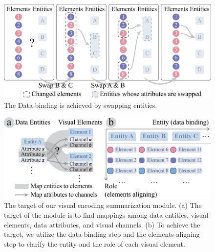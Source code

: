 \begin{figure}[tp]
    \centering
    \setlength{\belowcaptionskip}{-10pt}
    \includegraphics[width=1\columnwidth]{figures/DataBinding.eps}
    \caption{ The Data binding is achieved by swapping entities. 
    }
    \label{fig:DataBinding}
\end{figure}

\begin{figure}[tp]
    \centering
    \setlength{\belowcaptionskip}{-10pt}
    \includegraphics[width=1\columnwidth]{figures/ElementAligning.eps}
    \caption{The target of our visual encoding summarization module.
    (a) The target of the module is to find mappings among data entities, visual elements, data attributes, and visual channels. (b) To achieve the target, we utilize the data-binding step and the elements-aligning step to clarify the entity and the role of each visual element.}
    \label{fig:ElementAligning}
\end{figure}




